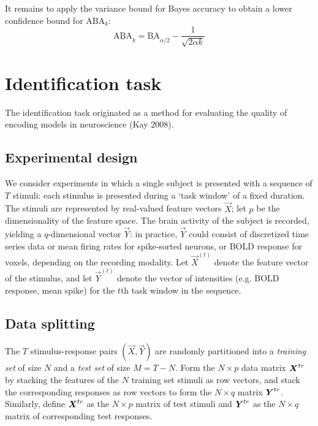 It remains to apply the variance bound for Bayes accuracy to obtain a lower confidence bound for $\text{ABA}_k$:
\[
\underline{\text{ABA}}_k = \underline{\text{BA}}_{\alpha/2} -  \frac{1}{\sqrt{2\alpha k}}
\]


\section{Identification task}\label{sec:identification}

The identification task originated as a method for evaluating the quality of encoding models in neuroscience (Kay 2008).

\subsection{Experimental design}

We consider experiments in which a single subject is presented with a
sequence of $T$ stimuli: each stimulus is presented during a `task
window' of a fixed duration.  The stimuli are represented by
real-valued feature vectors $\vec{X}$; let $p$ be the dimensionality of
the feature space.  The brain activity of the subject is recorded,
yielding a $q$-dimensional vector $\vec{Y}$: in practice, $\vec{Y}$ could
consist of discretized time series data or mean firing rates for
spike-sorted neurons, or BOLD response for voxels, depending on the
recording modality.  Let $\vec{X}^{(t)}$ denote the feature vector of the
stimulus, and let $\vec{Y}^{(t)}$ denote the vector of intensities
(e.g. BOLD response, mean spike) for the $t$th task window in the
sequence.

\subsection{Data splitting}

The $T$ stimulus-response pairs $(\vec{X}, \vec{Y})$ are randomly
partitioned into a \emph{training set} of size $N$ and a \emph{test
set} of size $M = T-N$.  Form the $N \times p$ data matrix $\boldsymbol{X}^{tr}$
by stacking the features of the $N$ training set stimuli as row
vectors, and stack the corresponding responses as row vectors to form
the $N \times q$ matrix $\boldsymbol{Y}^{tr}$.  Similarly, define $\boldsymbol{X}^{te}$ as
the $N \times p$ matrix of test stimuli and $\boldsymbol{Y}^{te}$ as the
$N \times q$ matrix of corresponding test responses.

